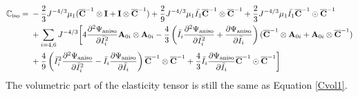 \begin{equation} \label{Ciso3}
\begin{split}
\mathbb{C}_\mathrm{iso} = {}& 
- \frac{2}{3}J^{-4/3}\mu_1({\overline{\bold{C}}}^{-1} \otimes \bold{I} + \bold{I} \otimes {\overline{\bold{C}}}^{-1})  +
\frac{2}{9}J^{-4/3}\mu_1\bar{I_1}  {\overline{\bold{C}}}^{-1} \otimes {\overline{\bold{C}}}^{-1} + \frac{2}{3}J^{-4/3} \mu_1\bar{I_1} {\overline{\bold{C}}}^{-1} \odot {\overline{\bold{C}}}^{-1} \\
&+ \sum_{i = 4, 6} J^{-4/3} \bigg[ 4\frac{\partial^2\Psi_\mathrm{aniso}}{\partial{\bar{I}_i}^2} \bold{A}_{0i} \otimes \bold{A}_{0i} - \frac{4}{3} \left( \bar{I}_i\frac{\partial^2\Psi_\mathrm{aniso}}{\partial{\bar{I}_i}^2} + \frac{\partial\Psi_\mathrm{aniso}}{\partial{\bar{I}_i}} \right) (\overline{\bold{C}}^{-1} \otimes \bold{A}_{0i} + \bold{A}_{0i} \otimes \overline{\bold{C}}^{-1}) \\
&+ \frac{4}{9} \left( {\bar{I}_i}^2\frac{\partial^2\Psi_\mathrm{aniso}}{\partial{\bar{I}_i}^2} - \bar{I}_i\frac{\partial\Psi_\mathrm{aniso}}{\partial{\bar{I}_i}} \right) \overline{\bold{C}}^{-1} \otimes \overline{\bold{C}}^{-1}
+ \frac{4}{3}\bar{I}_i \frac{\partial\Psi_\mathrm{aniso}}{\partial{\bar{I}_i}} \overline{\bold{C}}^{-1} \odot \overline{\bold{C}}^{-1} \bigg] 
\end{split}
\end{equation}
The volumetric part of the elasticity tensor is still the same as Equation \ref{Cvol1}.









